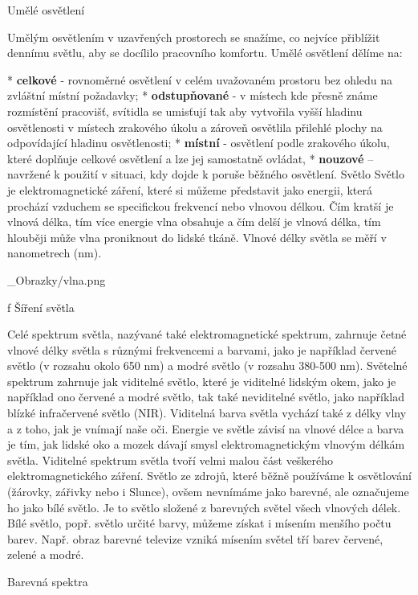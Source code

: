 \chap Umělé osvětlení

Umělým osvětlením v uzavřených prostorech se snažíme, co nejvíce přiblížit dennímu světlu, aby se docílilo pracovního komfortu. Umělé osvětlení dělíme na:

\medskip
\begitems
* {\bf celkové} -  rovnoměrné osvětlení v celém uvažovaném prostoru bez ohledu na zvláštní místní požadavky;
* {\bf odstupňované} - v místech kde přesně známe rozmístění pracovišť, svítidla se umisťují tak aby vytvořila vyšší hladinu osvětlenosti v místech zrakového úkolu a zároveň osvětlila přilehlé plochy na odpovídající hladinu osvětlenosti;
* {\bf místní} - osvětlení podle zrakového úkolu, které doplňuje celkové osvětlení a lze jej samostatně ovládat,
* {\bf nouzové}  – navržené k použití v situaci, kdy dojde k poruše běžného osvětlení.
\enditems
\sec Světlo
Světlo je elektromagnetické záření, které si můžeme představit jako energii, která prochází vzduchem se specifickou frekvencí nebo vlnovou délkou. Čím kratší je vlnová délka, tím více energie vlna obsahuje a čím delší je vlnová délka, tím hlouběji může vlna proniknout do lidské tkáně. Vlnové délky světla se měří v nanometrech (nm).

\medskip {}
\picw=10cm _Obrazky/vlna.png
\caption/f Šíření světla
\medskip

Celé spektrum světla, nazývané také elektromagnetické spektrum, zahrnuje četné vlnové délky světla s různými frekvencemi a barvami, jako je například červené světlo (v rozsahu okolo 650 nm) a modré světlo (v rozsahu 380-500 nm). Světelné spektrum zahrnuje jak viditelné světlo, které je viditelné lidským okem, jako je například ono červené a modré světlo, tak také neviditelné světlo, jako například blízké infračervené světlo (NIR). Viditelná barva světla vychází také z délky vlny a z toho, jak je vnímají naše oči. Energie ve světle závisí na vlnové délce a barva je tím, jak lidské oko a mozek dávají smysl elektromagnetickým vlnovým délkám světla. Viditelné spektrum světla tvoří velmi malou část veškerého elektromagnetického záření.
Světlo ze zdrojů, které běžně používáme k osvětlování (žárovky, zářivky nebo i Slunce), ovšem nevnímáme jako barevné, ale označujeme ho jako bílé světlo. Je to světlo složené z barevných světel všech vlnových délek.
Bílé světlo, popř. světlo určité barvy, můžeme získat i mísením menšího počtu barev. Např. obraz barevné televize vzniká mísením světel tří barev červené, zelené a modré.

\sec Barevná spektra


